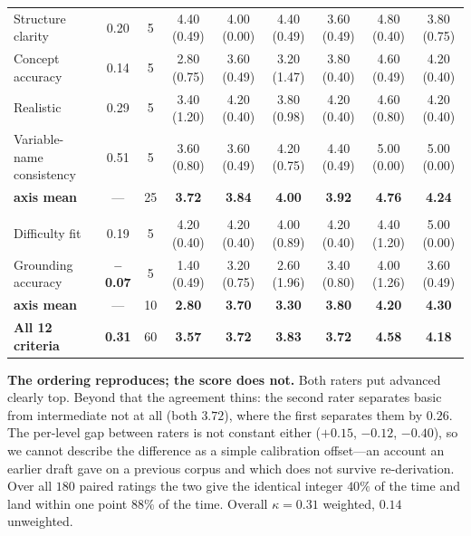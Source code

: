 \documentclass[conference]{IEEEtran}
\begin{document}
\begin{table}[t]
\begin{tabular}{@{}l c c cc cc cc@{}}
\quad Structure clarity & 0.20 & 5 & 4.40 \tiny(0.49) & 4.00 \tiny(0.00) & 4.40 \tiny(0.49) & 3.60 \tiny(0.49) & 4.80 \tiny(0.40) & 3.80 \tiny(0.75) \\
\quad Concept accuracy & 0.14 & 5 & 2.80 \tiny(0.75) & 3.60 \tiny(0.49) & 3.20 \tiny(1.47) & 3.80 \tiny(0.40) & 4.60 \tiny(0.49) & 4.20 \tiny(0.40) \\
\quad Realistic & 0.29 & 5 & 3.40 \tiny(1.20) & 4.20 \tiny(0.40) & 3.80 \tiny(0.98) & 4.20 \tiny(0.40) & 4.60 \tiny(0.80) & 4.20 \tiny(0.40) \\
\quad Variable-name consistency & 0.51 & 5 & 3.60 \tiny(0.80) & 3.60 \tiny(0.49) & 4.20 \tiny(0.75) & 4.40 \tiny(0.49) & 5.00 \tiny(0.00) & 5.00 \tiny(0.00) \\
\addlinespace[1pt]
\quad\textbf{axis mean} & --- & 25 & \textbf{3.72} & \textbf{3.84} & \textbf{4.00} & \textbf{3.92} & \textbf{4.76} & \textbf{4.24} \\
\addlinespace[3pt]
\multicolumn{9}{@{}l}{\emph{Physics / tier}} \\
\quad Difficulty fit & 0.19 & 5 & 4.20 \tiny(0.40) & 4.20 \tiny(0.40) & 4.00 \tiny(0.89) & 4.20 \tiny(0.40) & 4.40 \tiny(1.20) & 5.00 \tiny(0.00) \\
\quad Grounding accuracy & \textbf{--0.07} & 5 & 1.40 \tiny(0.49) & 3.20 \tiny(0.75) & 2.60 \tiny(1.96) & 3.40 \tiny(0.80) & 4.00 \tiny(1.26) & 3.60 \tiny(0.49) \\
\addlinespace[1pt]
\quad\textbf{axis mean} & --- & 10 & \textbf{2.80} & \textbf{3.70} & \textbf{3.30} & \textbf{3.80} & \textbf{4.20} & \textbf{4.30} \\
\addlinespace[3pt]
\midrule
\textbf{All 12 criteria} & \textbf{0.31} & 60 & \textbf{3.57} & \textbf{3.72} & \textbf{3.83} & \textbf{3.72} & \textbf{4.58} & \textbf{4.18} \\
\bottomrule
\end{tabular}
\end{table}

\textbf{The ordering reproduces; the score does not.} Both raters put advanced
clearly top. Beyond that the agreement thins: the second rater separates basic
from intermediate not at all (both $3.72$), where the first separates them by
$0.26$. The per-level gap between raters is not constant either
($+0.15$, $-0.12$, $-0.40$), so we cannot describe the difference as a simple
calibration offset---an account an earlier draft gave on a previous corpus and
which does not survive re-derivation. Over all $180$ paired ratings the two give
the identical integer $40\%$ of the time and land within one point $88\%$ of the
time. Overall $\kappa = 0.31$ weighted, $0.14$ unweighted.
\end{document}
